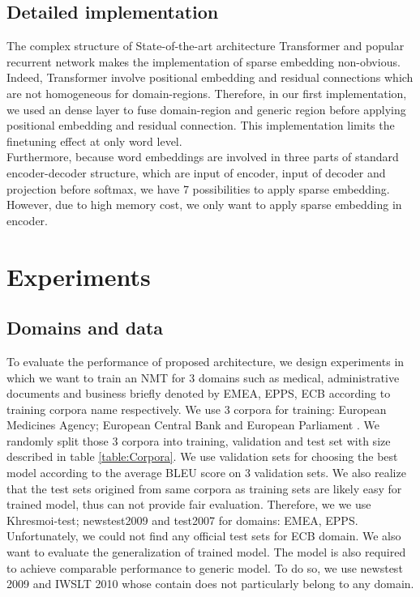 \documentclass[11pt,a4paper]{article}
\begin{document}
\subsection{Detailed implementation}
The complex structure of State-of-the-art architecture Transformer \cite{NIPS2017_7181} and popular recurrent network \cite{bahdanau2014neural} makes the implementation of sparse embedding non-obvious. Indeed, Transformer involve positional embedding and residual connections which are not homogeneous for domain-regions. Therefore, in our first implementation, we used an dense layer to fuse domain-region and generic region before applying positional embedding and residual connection. This implementation limits the finetuning effect at only word level.\\
Furthermore, because word embeddings are involved in three parts of standard encoder-decoder structure, which are input of encoder, input of decoder and projection before softmax, we have 7 possibilities to apply sparse embedding. However, due to high memory cost, we only want to apply sparse embedding in encoder.
\section{Experiments}
\subsection{Domains and data}
To evaluate the performance of proposed architecture, we design experiments in which we want to train an NMT for 3 domains such as medical, administrative documents and business briefly denoted by EMEA, EPPS, ECB according to training corpora name respectively. We use 3 corpora for training: European Medicines Agency; European Central Bank and European Parliament \cite{Tiedemann2009RANLP5}. We randomly split those 3 corpora into training, validation and test set with size described in table \ref{table:Corpora}. We use validation sets for choosing the best model according to the average BLEU score on 3 validation sets. We also realize that the test sets origined from same corpora as training sets are likely easy for trained model, thus can not provide fair evaluation. Therefore, we we use Khresmoi-test; newstest2009 and test2007 for domains: EMEA, EPPS. Unfortunately, we could not find any official test sets for ECB domain. We also want to evaluate the generalization of trained model. The model is also required to achieve comparable performance to generic model. To do so, we use newstest 2009 and IWSLT 2010 whose contain does not particularly belong to any domain.
\end{document}
